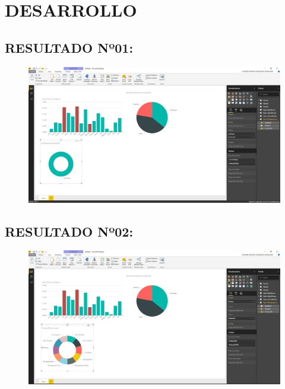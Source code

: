 \section{DESARROLLO}

\subsection{RESULTADO Nº01:}
\begin{figure}[httb]
\begin{center}
\includegraphics[width=15cm]{./Imagenes/Captura01}
\end{center}
\end{figure}

\subsection{RESULTADO Nº02:}
\begin{figure}[httb]
\begin{center}
\includegraphics[width=15cm]{./Imagenes/Captura02}
\end{center}
\end{figure}
\newpage
